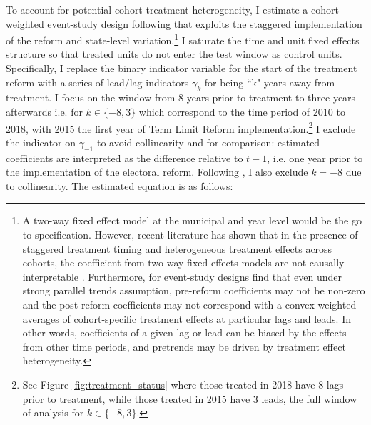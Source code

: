 \documentclass[12pt]{amsart}
\numberwithin{equation}{section}
\theoremstyle{definition}
\theoremstyle{definition}
\theoremstyle{definition}
\begin{document}

 To account for potential cohort treatment heterogeneity, I estimate  a cohort weighted event-study design following \citet{abraham_sun_2020} that exploits the staggered implementation of the reform and state-level variation.\footnote{A two-way fixed effect model at the municipal and year level would be the go to specification. However, recent literature has shown that in the presence of staggered treatment timing and heterogeneous treatment effects across cohorts, the coefficient from two-way fixed effects models are not causally interpretable \citep{goodman_bacon_2018, callaway_santana_2019, strezhnev_2018, chaisemarting_etal_2019}. Furthermore, for event-study designs \citet{abraham_sun_2020} find that even under strong parallel trends assumption, pre-reform coefficients may not be non-zero and the post-reform coefficients may not correspond with a convex weighted averages of cohort-specific treatment effects at particular lags and leads. In other words, coefficients of a given lag or lead can be biased by the effects from other time periods, and pretrends may be driven by treatment effect heterogeneity.}  
 I saturate the time and unit fixed effects structure so that treated units do not enter the test window as control units. Specifically, I replace the binary indicator variable for the start of the treatment reform with a series of lead/lag indicators $\gamma_k$ for being ``k" years away from treatment. I focus on the window from 8 years prior to treatment to three years afterwards i.e. for $k \in \{-8,3\} $ which correspond to the time period of 2010 to 2018, with 2015 the first year of Term Limit Reform implementation.\footnote{See Figure \ref{fig:treatment_status} where those treated in 2018 have 8 lags prior to treatment, while those treated in 2015 have 3 leads, the full window of analysis for $k \in \{-8,3\} $.} %
I exclude the indicator on $\gamma_{-1}$ to avoid collinearity and for comparison: estimated coefficients are interpreted as the difference relative to $t-1$, i.e. one year prior to the implementation of the electoral reform. Following   \citet{abraham_sun_2020}, I also exclude $k=-8$ due to collinearity. The estimated equation is as follows:
\end{document}
